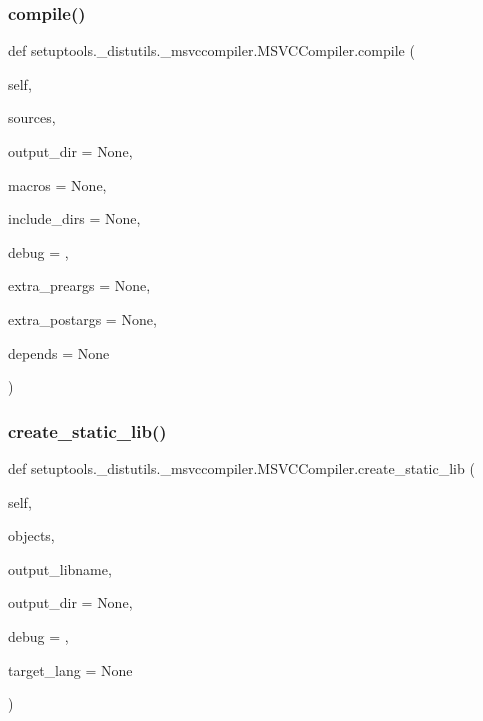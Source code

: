 \subsubsection{\texorpdfstring{compile()}{compile()}}
{\footnotesize\ttfamily def setuptools.\+\_\+distutils.\+\_\+msvccompiler.\+M\+S\+V\+C\+Compiler.\+compile (\begin{DoxyParamCaption}\item[{}]{self,  }\item[{}]{sources,  }\item[{}]{output\+\_\+dir = {\ttfamily None},  }\item[{}]{macros = {\ttfamily None},  }\item[{}]{include\+\_\+dirs = {\ttfamily None},  }\item[{}]{debug = {},  }\item[{}]{extra\+\_\+preargs = {\ttfamily None},  }\item[{}]{extra\+\_\+postargs = {\ttfamily None},  }\item[{}]{depends = {\ttfamily None} }\end{DoxyParamCaption})}

\mbox{\label{classsetuptools_1_1__distutils_1_1__msvccompiler_1_1MSVCCompiler_a2fa7642d2486732907523f795803b56b}} 
\subsubsection{\texorpdfstring{create\+\_\+static\+\_\+lib()}{create\_static\_lib()}}
{\footnotesize\ttfamily def setuptools.\+\_\+distutils.\+\_\+msvccompiler.\+M\+S\+V\+C\+Compiler.\+create\+\_\+static\+\_\+lib (\begin{DoxyParamCaption}\item[{}]{self,  }\item[{}]{objects,  }\item[{}]{output\+\_\+libname,  }\item[{}]{output\+\_\+dir = {\ttfamily None},  }\item[{}]{debug = {},  }\item[{}]{target\+\_\+lang = {\ttfamily None} }\end{DoxyParamCaption})}


